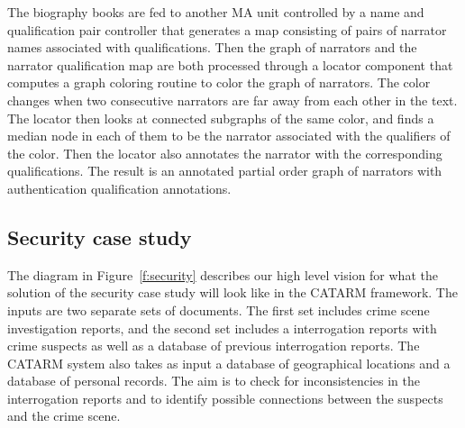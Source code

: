 \documentclass[12pt]{article}
\begin{document}
The biography books are fed to another MA unit controlled by 
a name and qualification pair controller that generates a 
map consisting of pairs of narrator names associated with 
qualifications. 
Then the graph of narrators and the narrator qualification map
are both processed through a locator component that computes
a graph coloring routine to color the graph of narrators. 
The color changes when two consecutive narrators are far away
from each other in the text. 
The locator then looks at connected subgraphs of the same color,
and finds a median node in each of them to be the narrator 
associated with the qualifiers of the color. 
Then the locator also annotates the narrator with the 
corresponding qualifications. 
The result is an annotated partial order graph of narrators
with authentication qualification annotations. 

\subsection{Security case study}
\label{s:design:sec}

\begin{figure}
\end{figure}


The diagram in Figure~\ref{f:security} describes our 
high level vision for what the solution of the 
security case study
will look like in the CATARM framework. 
The inputs are two separate sets of documents. 
The first set includes crime scene investigation reports, 
and the second set includes a 
interrogation reports with crime suspects as well as 
a database of previous interrogation reports. 
The CATARM system also takes as input a database of geographical
locations and a database of personal records. 
The aim is to check for inconsistencies in the interrogation
reports and to identify possible connections between the suspects
and the crime scene. 
\end{document}
